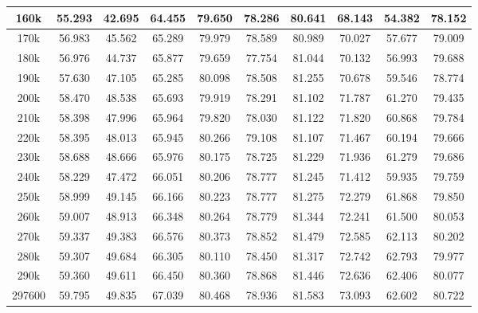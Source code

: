 \documentclass[12pt]{article}
\numberwithin{equation}{section}
\begin{document}
\begin{center}
{\begin{tabular}{|c|c|c|c|c|c|c|c|c|c|}
160k   & 55.293 & 42.695 & 64.455 & 79.650 & 78.286 & 80.641 & 68.143 & 54.382 & 78.152 \\ \hline
170k   & 56.983 & 45.562 & 65.289 & 79.979 & 78.589 & 80.989 & 70.027 & 57.677 & 79.009 \\ \hline
180k   & 56.976 & 44.737 & 65.877 & 79.659 & 77.754 & 81.044 & 70.132 & 56.993 & 79.688 \\ \hline
190k   & 57.630 & 47.105 & 65.285 & 80.098 & 78.508 & 81.255 & 70.678 & 59.546 & 78.774 \\ \hline
200k   & 58.470 & 48.538 & 65.693 & 79.919 & 78.291 & 81.102 & 71.787 & 61.270 & 79.435 \\ \hline
210k   & 58.398 & 47.996 & 65.964 & 79.820 & 78.030 & 81.122 & 71.820 & 60.868 & 79.784 \\ \hline
220k   & 58.395 & 48.013 & 65.945 & 80.266 & 79.108 & 81.107 & 71.467 & 60.194 & 79.666 \\ \hline
230k   & 58.688 & 48.666 & 65.976 & 80.175 & 78.725 & 81.229 & 71.936 & 61.279 & 79.686 \\ \hline
240k   & 58.229 & 47.472 & 66.051 & 80.206 & 78.777 & 81.245 & 71.412 & 59.935 & 79.759 \\ \hline
250k   & 58.999 & 49.145 & 66.166 & 80.223 & 78.777 & 81.275 & 72.279 & 61.868 & 79.850 \\ \hline
260k   & 59.007 & 48.913 & 66.348 & 80.264 & 78.779 & 81.344 & 72.241 & 61.500 & 80.053 \\ \hline
270k   & 59.337 & 49.383 & 66.576 & 80.373 & 78.852 & 81.479 & 72.585 & 62.113 & 80.202 \\ \hline
280k   & 59.307 & 49.684 & 66.305 & 80.110 & 78.450 & 81.317 & 72.742 & 62.793 & 79.977 \\ \hline
290k   & 59.360 & 49.611 & 66.450 & 80.360 & 78.868 & 81.446 & 72.636 & 62.406 & 80.077 \\ \hline
297600 & 59.795 & 49.835 & 67.039 & 80.468 & 78.936 & 81.583 & 73.093 & 62.602 & 80.722 \\ \hline
\end{tabular}}
\label{tab:temp200003535}
\vspace*{\fill}
\end{center}
\end{document}
